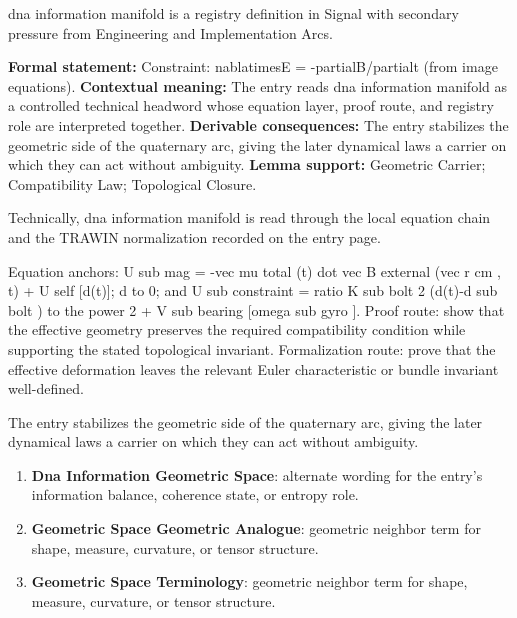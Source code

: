
\begingroup\small
{}
dna information manifold is a registry definition in Signal with secondary pressure from Engineering and Implementation Arcs.

\begingroup\footnotesize\setlength{\emergencystretch}{3em}\sloppy
\textbf{Formal statement:} Constraint: nablatimesE = -partialB/partialt (from image equations). \textbf{Contextual meaning:} The entry reads dna information manifold as a controlled technical headword whose equation layer, proof route, and registry role are interpreted together. \textbf{Derivable consequences:} The entry stabilizes the geometric side of the quaternary arc, giving the later dynamical laws a carrier on which they can act without ambiguity. \textbf{Lemma support:} Geometric Carrier; Compatibility Law; Topological Closure.\par
\endgroup

Technically, dna information manifold is read through the local equation chain and the TRAWIN normalization recorded on the entry page.

Equation anchors: U sub mag = -vec mu total (t) dot vec B external (vec r cm , t) + U self [d(t)]; d to 0; and U sub constraint = ratio K sub bolt 2 (d(t)-d sub bolt ) to the power 2 + V sub bearing [omega sub gyro ]. Proof route: show that the effective geometry preserves the required compatibility condition while supporting the stated topological invariant. Formalization route: prove that the effective deformation leaves the relevant Euler characteristic or bundle invariant well-defined.

The entry stabilizes the geometric side of the quaternary arc, giving the later dynamical laws a carrier on which they can act without ambiguity.
\endgroup

\begin{enumerate}[leftmargin=1.6em,itemsep=6pt,topsep=4pt]
\item \textbf{Dna Information Geometric Space}: alternate wording for the entry's information balance, coherence state, or entropy role.
\item \textbf{Geometric Space Geometric Analogue}: geometric neighbor term for shape, measure, curvature, or tensor structure.
\item \textbf{Geometric Space Terminology}: geometric neighbor term for shape, measure, curvature, or tensor structure.
\end{enumerate}

